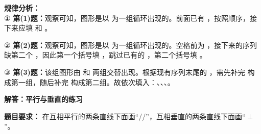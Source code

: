 {\small\color{gray}
\textbf{规律分析：}\\
① \textbf{第(1)题：}观察可知，图形是以 \tikzTriangle{} \tikzCircle{} \tikzSquare{} 为一组循环出现的。前面已有 \tikzTriangle{} \tikzCircle{}，按照顺序，接下来应填 \tikzSquare{} 和 \tikzTriangle{}。

\vspace{0.3cm}
② \textbf{第(2)题：}观察可知，图形是以 \tikzSquare{} \tikzSquare{} \tikzCircle{} \tikzTriangle{} 为一组循环出现的。空格前为 \tikzSquare{}，接下来的序列缺第二个 \tikzSquare{}，因此第一个括号填 \tikzSquare{}，跳过已有的 \tikzCircle{}，第二个括号填 \tikzTriangle{}。

\vspace{0.3cm}
③ \textbf{第(3)题：}该组图形由 \tikzSolidTriangle{} \tikzStar{} \tikzStar{} 和 \tikzSolidTriangle{} \tikzSolidTriangle{} \tikzSolidTriangle{} 两组交替出现。根据现有序列末尾的 \tikzSolidTriangle{} \tikzStar{}，需先补完 \tikzStar{} 构成第一组，随后补完 \tikzSolidTriangle{} \tikzSolidTriangle{} \tikzSolidTriangle{} 构成第二组。故依次填入：\tikzStar{}、\tikzSolidTriangle{}、\tikzSolidTriangle{}、\tikzSolidTriangle{}。
}




\newpage

\begin{center}
  {\large\bfseries 解答：平行与垂直的练习}
\end{center}

\vspace{0.6cm}

\noindent
{\small \textbf{题目要求：} 在互相平行的两条直线下面画“//”，互相垂直的两条直线下面画“$\perp$”。}

\vspace{0.8cm}

